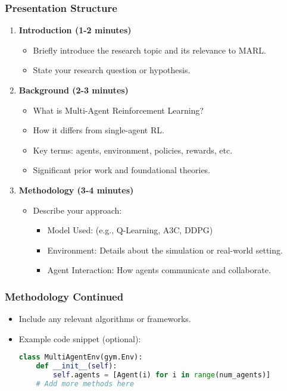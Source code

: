 \documentclass[aspectratio=169]{beamer}
\begin{document}
\begin{frame}
    \frametitle{Presentation Structure}
    \begin{enumerate}
        \item \textbf{Introduction (1-2 minutes)}
            \begin{itemize}
                \item Briefly introduce the research topic and its relevance to MARL.
                \item State your research question or hypothesis.
            \end{itemize}
        \item \textbf{Background (2-3 minutes)}
            \begin{itemize}
                \item What is Multi-Agent Reinforcement Learning?
                \item How it differs from single-agent RL.
                \item Key terms: agents, environment, policies, rewards, etc.
                \item Significant prior work and foundational theories.
            \end{itemize}
        \item \textbf{Methodology (3-4 minutes)}
            \begin{itemize}
                \item Describe your approach:
                \begin{itemize}
                    \item Model Used: (e.g., Q-Learning, A3C, DDPG)
                    \item Environment: Details about the simulation or real-world setting.
                    \item Agent Interaction: How agents communicate and collaborate.
                \end{itemize}
            \end{itemize}
    \end{enumerate}
\end{frame}

\begin{frame}[fragile]
    \frametitle{Methodology Continued}
    \begin{itemize}
        \item Include any relevant algorithms or frameworks.
        \item Example code snippet (optional):
        \begin{lstlisting}[language=Python]
class MultiAgentEnv(gym.Env):
    def __init__(self):
        self.agents = [Agent(i) for i in range(num_agents)]
    # Add more methods here
        \end{lstlisting}
    \end{itemize}
\end{frame}
\end{document}
